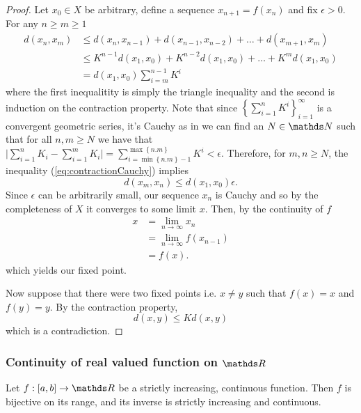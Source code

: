 \begin{proof}
Let $x_{0}\in X$ be arbitrary, define a sequence $x_{n+1}=f\left(x_{n}\right)$
and fix $\epsilon>0$. For any $n\geq m\geq1$
\begin{align}
d\left(x_{n},x_{m}\right) & \leq d\left(x_{n},x_{n-1}\right)+d\left(x_{n-1},x_{n-2}\right)+\ldots+d\left(x_{m+1},x_{m}\right)\nonumber \\
 & \leq K^{n-1}d\left(x_{1},x_{0}\right)+K^{n-2}d\left(x_{1},x_{0}\right)+\ldots+K^{m}d\left(x_{1},x_{0}\right)\nonumber \\
 & =d\left(x_{1},x_{0}\right)\sum_{i=m}^{n-1}K^{i}\label{eq:contractionCauchy}
\end{align}
where the first inequalitity is simply the triangle inequality and
the second is induction on the contraction property. Note that since
$\left\{ \sum_{i=1}^{n}K^{i}\right\} _{i=1}^{\infty}$ is a convergent
geometric series, it's Cauchy as in we can find an $N\in\N$ such
that for all $n,m\geq N$ we have that $\lvert\sum_{i=1}^{n}K_{i}-\sum_{i=1}^{m}K_{i}\rvert=\sum_{i=\min\left\{ n.m\right\} -1}^{\max\left\{ n.m\right\} }K^{i}<\epsilon.$
Therefore, for $m,n\geq N$, the inequality (\ref{eq:contractionCauchy})
implies
\[
d\left(x_{m},x_{n}\right)\leq d\left(x_{1},x_{0}\right)\epsilon.
\]
Since $\epsilon$ can be arbitrarily small, our sequence $x_{n}$
is Cauchy and so by the completeness of $X$ it converges to some
limit $x.$ Then, by the continuity of $f$
\begin{align*}
x & =\lim_{n\to\infty}x_{n}\\
 & =\lim_{n\to\infty}f(x_{n-1})\\
 & =f(x).
\end{align*}
which yields our fixed point.

Now suppose that there were two fixed points i.e. $x\neq y$ such
that $f\left(x\right)=x$ and $f\left(y\right)=y$. By the contraction
property,
\[
d\left(x,y\right)\leq Kd\left(x,y\right)
\]
which is a contradiction.
\end{proof}

\subsubsection{Continuity of real valued function on $\protect\R$}
\begin{prop}
\label{prop:strictlyIncreasingContinuousFunctionInverse}Let $f:\left[a,b\right]\to\R$
be a strictly increasing, continuous function. Then $f$ is bijective
on its range, and its inverse is strictly increasing and continuous.
\end{prop}

